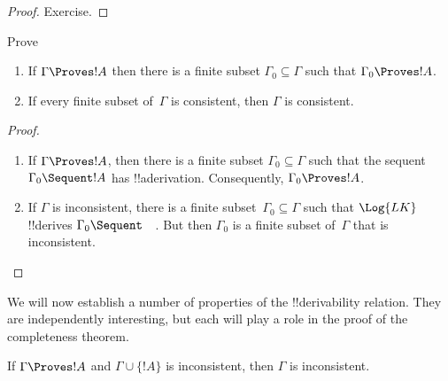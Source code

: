 \begin{proof}
Exercise.
\end{proof}

\begin{prob}
Prove 
\end{prob}

\begin{prop}[Compactness]
  \begin{enumerate}
  \item If $\Gamma \Proves !A$ then there is a finite subset $\Gamma_0
    \subseteq \Gamma$ such that $\Gamma_0 \Proves !A$.
  \item If every finite subset of~$\Gamma$ is
    consistent, then $\Gamma$ is consistent.
  \end{enumerate}
\end{prop}

\begin{proof}
  \begin{enumerate}
    \item If $\Gamma \Proves !A$, then there is a finite subset
      $\Gamma_0 \subseteq \Gamma$ such that the sequent $\Gamma_0
      \Sequent !A$ has !!a{derivation}. Consequently, $\Gamma_0
      \Proves !A$.
    \item If $\Gamma$ is inconsistent, there is a finite
      subset~$\Gamma_0 \subseteq \Gamma$ such that $\Log{LK}$
      !!{derive}s $\Gamma_0 \Sequent \quad$. But then $\Gamma_0$ is a
      finite subset of~$\Gamma$ that is inconsistent.
  \end{enumerate}
\end{proof}







We will now establish a number of properties of the !!{derivability}
relation.  They are independently interesting, but each will play a
role in the proof of the completeness theorem.

\begin{prop}
  If $\Gamma \Proves !A$ and $\Gamma \cup \{!A\}$ is
  inconsistent, then $\Gamma$ is inconsistent.
\end{prop}

